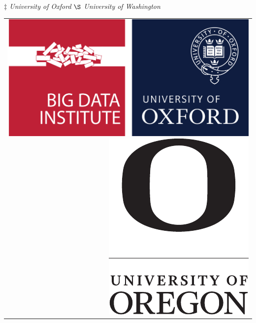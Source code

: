 \documentclass[landscape,a0paper,fontscale=0.292]{baposter}
\begin{document}
\begin{poster}
{    {\small \textit{$\ddagger$ University of Oxford} } %
    {\small \textit{$\S$ University of Washington}} \\
  }
 {
  \begin{tabular}{r}
    \includegraphics[height=0.12\textheight]{oxford-logo.jpeg}
      \hspace{1em}
    \includegraphics[height=0.12\textheight]{UOSignature-STK-BLK}\\
  \end{tabular}
 }



\end{poster}
\end{document}
